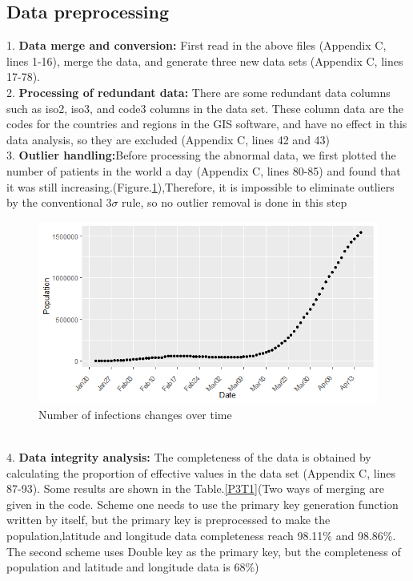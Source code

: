\documentclass[a4paper, 11pt,twoside=true]{scrartcl}
\begin{document}
\subsection{Data preprocessing}1. \textbf{Data merge and conversion: }First read in the above files (Appendix C, lines 1-16), merge the data, and generate three new data sets (Appendix C, lines 17-78).\\
2. \textbf{Processing of redundant data: }There are some redundant data columns such as iso2, iso3, and code3 columns in the data set. These column data are the codes for the countries and regions in the GIS software, and have no effect in this data analysis, so they are excluded (Appendix C, lines 42 and 43)\\
3. \textbf{Outlier handling:}Before processing the abnormal data, we first plotted the number of patients in the world a day (Appendix C, lines 80-85) and found that it was still increasing.(Figure.\ref{P3F1}),Therefore, it is impossible to eliminate outliers by the conventional $3\sigma$ rule, so no outlier removal is done in this step\\
\begin{figure}[h]
	\small
	\centering
	\includegraphics[width=13cm]{P3F1}
	\caption{Number of infections changes over time} \label{P3F1}
\end{figure}\\
4. \textbf{Data integrity analysis: }The completeness of the data is obtained by calculating the proportion of effective values in the data set (Appendix C, lines 87-93). Some results are shown in the Table.\ref{P3T1}(Two ways of merging are given in the code. Scheme one needs to use the primary key generation function written by itself, but the primary key is preprocessed to make the population,latitude and longitude data completeness reach 98.11\% and 98.86\%. The second scheme uses Double key as the primary key, but the completeness of population and latitude and longitude data is 68\%)
\end{document}
